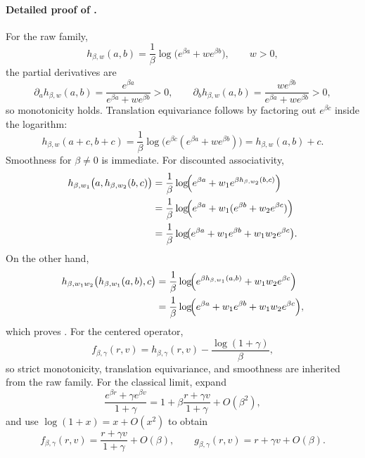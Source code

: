 \documentclass{article}
\theoremstyle{remark}
\begin{document}
\paragraph{Detailed proof of .}
For the raw family,
\[
 h_{\beta,w}(a,b)=\frac{1}{\beta}\log\!\bigl(e^{\beta a}+w e^{\beta b}\bigr),
\qquad w>0,
\]
the partial derivatives are
\[
\partial_a h_{\beta,w}(a,b)=\frac{e^{\beta a}}{e^{\beta a}+w e^{\beta b}}>0,
\qquad
\partial_b h_{\beta,w}(a,b)=\frac{w e^{\beta b}}{e^{\beta a}+w e^{\beta b}}>0,
\]
so monotonicity holds.
Translation equivariance follows by factoring out $e^{\beta c}$ inside the logarithm:
\[
 h_{\beta,w}(a+c,b+c)=\frac{1}{\beta}\log\!\bigl(e^{\beta c}(e^{\beta a}+w e^{\beta b})\bigr)=h_{\beta,w}(a,b)+c.
\]
Smoothness for $\beta\neq 0$ is immediate.
For discounted associativity,
\begin{align*}
 h_{\beta,w_1}\bigl(a,h_{\beta,w_2}(b,c)\bigr)
 &= \frac{1}{\beta}\log\!\Bigl(e^{\beta a}+w_1 e^{\beta h_{\beta,w_2}(b,c)}\Bigr)\\
 &= \frac{1}{\beta}\log\!\Bigl(e^{\beta a}+w_1(e^{\beta b}+w_2 e^{\beta c})\Bigr)\\
 &= \frac{1}{\beta}\log\!\bigl(e^{\beta a}+w_1 e^{\beta b}+w_1w_2 e^{\beta c}\bigr).
\end{align*}
On the other hand,
\begin{align*}
 h_{\beta,w_1w_2}\bigl(h_{\beta,w_1}(a,b),c\bigr)
 &= \frac{1}{\beta}\log\!\Bigl(e^{\beta h_{\beta,w_1}(a,b)}+w_1w_2 e^{\beta c}\Bigr)\\
 &= \frac{1}{\beta}\log\!\Bigl(e^{\beta a}+w_1 e^{\beta b}+w_1w_2 e^{\beta c}\Bigr),
\end{align*}
which proves .
For the centered operator,
\[
 f_{\beta,\gamma}(r,v)=h_{\beta,\gamma}(r,v)-\frac{\log(1+\gamma)}{\beta},
\]
so strict monotonicity, translation equivariance, and smoothness are inherited from the raw family.
For the classical limit, expand
\[
\frac{e^{\beta r}+\gamma e^{\beta v}}{1+\gamma}
=1+\beta\frac{r+\gamma v}{1+\gamma}+O(\beta^2),
\]
and use $\log(1+x)=x+O(x^2)$ to obtain
\[
 f_{\beta,\gamma}(r,v)=\frac{r+\gamma v}{1+\gamma}+O(\beta),
\qquad
 g_{\beta,\gamma}(r,v)=r+\gamma v+O(\beta).
\]
\end{document}
